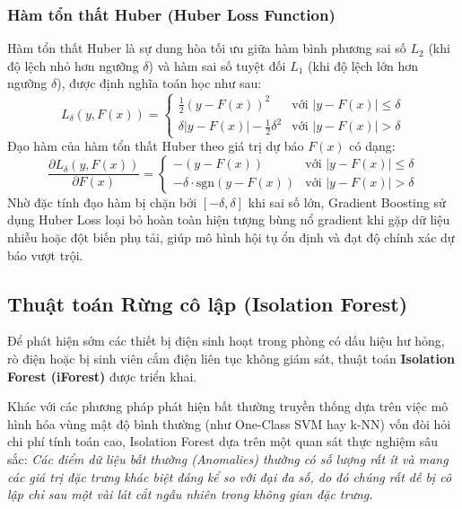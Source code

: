 \subsubsection{Hàm tổn thất Huber (Huber Loss Function)}
Hàm tổn thất Huber là sự dung hòa tối ưu giữa hàm bình phương sai số $L_2$ (khi độ lệch nhỏ hơn ngưỡng $\delta$) và hàm sai số tuyệt đối $L_1$ (khi độ lệch lớn hơn ngưỡng $\delta$), được định nghĩa toán học như sau:
\begin{equation}
    L_\delta(y, F(x)) = 
    \begin{cases} 
        \frac{1}{2} (y - F(x))^2 & \text{với } |y - F(x)| \le \delta \\[0.2cm]
        \delta |y - F(x)| - \frac{1}{2} \delta^2 & \text{với } |y - F(x)| > \delta 
    \end{cases}
    \label{eq:huber_loss}
\end{equation}
Đạo hàm của hàm tổn thất Huber theo giá trị dự báo $F(x)$ có dạng:
\begin{equation}
    \frac{\partial L_\delta(y, F(x))}{\partial F(x)} = 
    \begin{cases} 
        -(y - F(x)) & \text{với } |y - F(x)| \le \delta \\[0.2cm]
        -\delta \cdot \text{sgn}(y - F(x)) & \text{với } |y - F(x)| > \delta 
    \end{cases}
    \label{eq:huber_derivative}
\end{equation}
Nhờ đặc tính đạo hàm bị chặn bởi $[-\delta, \delta]$ khi sai số lớn, Gradient Boosting sử dụng Huber Loss loại bỏ hoàn toàn hiện tượng bùng nổ gradient khi gặp dữ liệu nhiễu hoặc đột biến phụ tải, giúp mô hình hội tụ ổn định và đạt độ chính xác dự báo vượt trội.

\subsection{Thuật toán Rừng cô lập (Isolation Forest)}
Để phát hiện sớm các thiết bị điện sinh hoạt trong phòng có dấu hiệu hư hỏng, rò điện hoặc bị sinh viên cắm điện liên tục không giám sát, thuật toán \textbf{Isolation Forest (iForest)} được triển khai.

Khác với các phương pháp phát hiện bất thường truyền thống dựa trên việc mô hình hóa vùng mật độ bình thường (như One-Class SVM hay k-NN) vốn đòi hỏi chi phí tính toán cao, Isolation Forest dựa trên một quan sát thực nghiệm sâu sắc: \textit{Các điểm dữ liệu bất thường (Anomalies) thường có số lượng rất ít và mang các giá trị đặc trưng khác biệt đáng kể so với đại đa số, do đó chúng rất dễ bị cô lập chỉ sau một vài lát cắt ngẫu nhiên trong không gian đặc trưng.}

